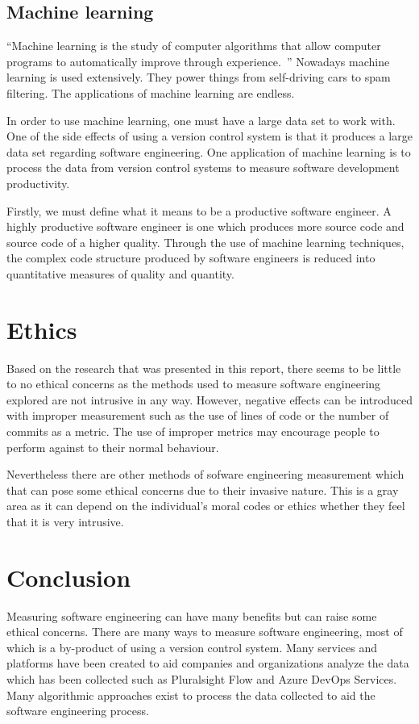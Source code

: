\documentclass{article}
\begin{document}
\subsection{Machine learning}
``Machine learning is the study of computer algorithms that allow computer
programs to automatically improve through
experience.~\cite{machine1997learning}'' Nowadays machine learning is used
extensively. They power things from self-driving cars to spam filtering. The
applications of machine learning are endless.

In order to use machine learning, one must have a large data set to work with.
One of the side effects of using a version control system is that it produces a
large data set regarding software engineering. One application of machine
learning is to process the data from version control systems to measure
software development productivity.

Firstly, we must define what it means to be a productive software engineer. A
highly productive software engineer is one which produces more source code and
source code of a higher quality. Through the use of machine learning
techniques, the complex code structure produced by software engineers is
reduced into quantitative measures of quality and
quantity.~\cite{helie2018measuring}

\section{Ethics}
Based on the research that was presented in this report, there seems to be
little to no ethical concerns as the methods used to measure software
engineering explored are not intrusive in any way. However, negative effects
can be introduced with improper measurement such as the use of lines of code or
the number of commits as a metric. The use of improper metrics may encourage
people to perform against to their normal behaviour.

Nevertheless there are other methods of sofware engineering measurement which
that can pose some ethical concerns due to their invasive nature. This is a
gray area as it can depend on the individual's moral codes or ethics whether
they feel that it is very intrusive.

\section{Conclusion}
Measuring software engineering can have many benefits but can raise some
ethical concerns. There are many ways to measure software engineering, most of
which is a by-product of using a version control system. Many services and
platforms have been created to aid companies and organizations analyze the data
which has been collected such as Pluralsight Flow and Azure DevOps Services.
Many algorithmic approaches exist to process the data collected to aid the
software engineering process.

\newpage



\end{document}
